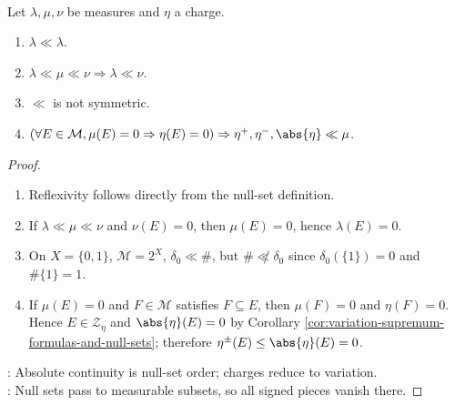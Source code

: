 \begin{proposition} \label{prop:absolute-continuity-basic-calculus} \\
Let $\lambda,\mu,\nu$ be measures and $\eta$ a charge.
\begin{enumerate}[label=(\roman*)]
\setlength{\itemsep}{0pt}
\item $\lambda\ll\lambda$.
\item $\lambda\ll\mu\ll\nu\Rightarrow\lambda\ll\nu$.
\item $\ll$ is not symmetric.
\item $(\forall E\in\mathcal{M},\mu(E)=0\Rightarrow\eta(E)=0)\Rightarrow\eta^+,\eta^-,\abs{\eta}\ll\mu$.
\end{enumerate}
\begin{proof}
\begin{enumerate}[label=(\roman*)]
\setlength{\itemsep}{0pt}
\item Reflexivity follows directly from the null-set definition.
\item If $\lambda\ll\mu\ll\nu$ and $\nu(E)=0$, then $\mu(E)=0$, hence $\lambda(E)=0$.
\item On $X=\{0,1\}$, $\mathcal{M}=2^X$, $\delta_0\ll\#$, but $\#\not\ll\delta_0$ since $\delta_0(\{1\})=0$ and $\#\{1\}=1$.
\item If $\mu(E)=0$ and $F\in\mathcal{M}$ satisfies $F\subseteq E$, then $\mu(F)=0$ and $\eta(F)=0$.\\
Hence $E\in\mathcal{Z}_\eta$ and $\abs{\eta}(E)=0$ by Corollary \ref{cor:variation-supremum-formulas-and-null-sets}; therefore $\eta^\pm(E)\leq\abs{\eta}(E)=0$.
\end{enumerate}
: Absolute continuity is null-set order; charges reduce to variation.\\
: Null sets pass to measurable subsets, so all signed pieces vanish there.
\end{proof}
\end{proposition}

